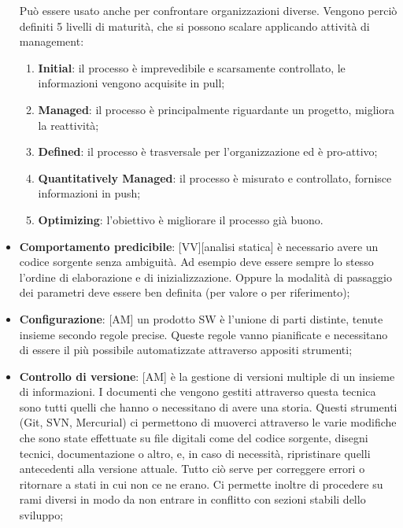 \begin{itemize}
		Può essere usato anche per confrontare organizzazioni diverse. \newline
		Vengono perciò definiti 5 livelli di maturità, che si possono scalare applicando attività di management:
			\begin{enumerate}
				\item \textbf{Initial}: il processo è imprevedibile e scarsamente controllato, le informazioni vengono acquisite in pull;
				\item \textbf{Managed}: il processo è principalmente riguardante un progetto, migliora la reattività;
				\item \textbf{Defined}: il processo è trasversale per l'organizzazione ed è pro-attivo;
				\item \textbf{Quantitatively Managed}: il processo è misurato e controllato, fornisce informazioni in push;
				\item \textbf{Optimizing}: l'obiettivo è migliorare il processo già buono.
			\end{enumerate}


		\item \textbf{Comportamento predicibile}: [VV][analisi statica] è necessario avere un codice sorgente senza ambiguità. Ad esempio deve essere sempre lo stesso l'ordine di elaborazione e di inizializzazione. Oppure la modalità di passaggio dei parametri deve essere ben definita (per valore o per riferimento);

		\item \textbf{Configurazione}: [AM] un prodotto SW è l'unione di parti distinte, tenute insieme secondo regole precise. Queste regole vanno pianificate e necessitano di essere il più possibile automatizzate attraverso appositi strumenti;
		\item \textbf{Controllo di versione}: [AM]  è la gestione di versioni multiple di un insieme di informazioni. I documenti che vengono gestiti attraverso questa tecnica sono tutti quelli che hanno o necessitano di avere una storia.\newline
	Questi strumenti (Git, SVN, Mercurial) ci permettono di muoverci attraverso le varie modifiche che sono state effettuate su file digitali come del codice sorgente, disegni tecnici, documentazione o altro, e, in caso di necessità, ripristinare quelli antecedenti alla versione attuale. \newline
	Tutto ciò serve per correggere errori o ritornare a stati in cui non ce ne erano. Ci permette inoltre di procedere su rami diversi in modo da non entrare in conflitto con sezioni stabili dello sviluppo;


\end{itemize}
